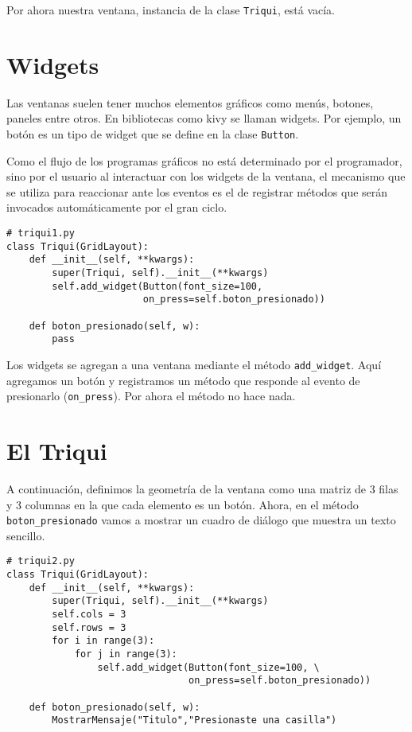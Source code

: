 Por ahora nuestra ventana, instancia de la clase \texttt{Triqui},
está vacía.

\section{Widgets}

Las ventanas suelen tener muchos elementos gráficos como menús, botones,
paneles entre otros. En bibliotecas como kivy se llaman widgets. Por
ejemplo, un botón es un tipo de widget que se define en la clase \texttt{Button}.

Como el flujo de los programas gráficos no está determinado por el
programador, sino por el usuario al interactuar con los widgets de
la ventana, el mecanismo que se utiliza para reaccionar ante los eventos
es el de registrar métodos que serán invocados automáticamente por
el gran ciclo.

\begin{verbatim}
# triqui1.py
class Triqui(GridLayout):
    def __init__(self, **kwargs):
        super(Triqui, self).__init__(**kwargs)
        self.add_widget(Button(font_size=100, 
                        on_press=self.boton_presionado))
    
    def boton_presionado(self, w):
        pass
\end{verbatim}

Los widgets se agregan a una ventana mediante el método \texttt{add\_widget}.
Aquí agregamos un botón y registramos un método que responde al evento
de presionarlo (\texttt{on\_press}). Por ahora el método no hace nada.

\section{El Triqui}

A continuación, definimos la geometría de la ventana como una matriz
de 3 filas y 3 columnas en la que cada elemento es un botón. Ahora,
en el método \texttt{boton\_presionado} vamos a mostrar un cuadro
de diálogo que muestra un texto sencillo.

\begin{verbatim}
# triqui2.py
class Triqui(GridLayout):
    def __init__(self, **kwargs):
        super(Triqui, self).__init__(**kwargs)
        self.cols = 3
        self.rows = 3
        for i in range(3):
            for j in range(3):
                self.add_widget(Button(font_size=100, \
                                on_press=self.boton_presionado))
        
    def boton_presionado(self, w):
        MostrarMensaje("Titulo","Presionaste una casilla")
\end{verbatim}

